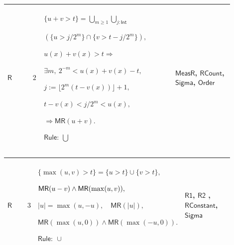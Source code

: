 \documentclass[12pt,reqno]{amsart}
\theoremstyle{blueplain}
\numberwithin{equation}{section}
\begin{document}
{\scriptsize \setlength{\parskip}{0pt}\nointerlineskip
\noindent 
\begin{tabular}{|@{}>{\centering\arraybackslash}m{0.10658\linewidth}|>{\centering\arraybackslash}m{0.03553\linewidth}|>{\centering\arraybackslash}m{0.52105\linewidth}|>{\centering\arraybackslash}m{0.23684\linewidth}|}
\hline
\hypertarget{dct:R2}{$\displaystyle \mathsf{R}$} & $\displaystyle 2$ & $%
\displaystyle \{u+v>t\}=\bigcup_{m\ge1}\bigcup_{j:\mathsf{Int}}$\par$%
\displaystyle (\{u>j/2^m\}\cap\{v>t-j/2^m\}),$\par$\displaystyle %
u(x)+v(x)>t\Rightarrow$\par$\displaystyle \exists m,\ 2^{-m}<u(x)+v(x)-t,$%
\par$\displaystyle j:=\lfloor2^m(t-v(x))\rfloor+1,$\par$\displaystyle %
t-v(x)<j/2^m<u(x),$\par$\displaystyle \Rightarrow\mathsf{MR}(u+v).$\par$%
\displaystyle \mathsf{Rule}:\ \bigcup$ & \hyperlink{dctdef:MeasR}{$%
\displaystyle \mathsf{MeasR}$}, \hyperlink{dct:RCount}{$\displaystyle 
\mathsf{RCount}$}, \hyperlink{ax:Sigma}{$\displaystyle \mathsf{Sigma}$}, 
\hyperlink{ax:Order}{$\displaystyle \mathsf{Order}$} \\ \hline
\end{tabular}%
}

{\scriptsize \setlength{\parskip}{0pt}\nointerlineskip
\noindent 
\begin{tabular}{|@{}>{\centering\arraybackslash}m{0.10658\linewidth}|>{\centering\arraybackslash}m{0.03553\linewidth}|>{\centering\arraybackslash}m{0.52105\linewidth}|>{\centering\arraybackslash}m{0.23684\linewidth}|}
\hline
\hypertarget{dct:R3}{$\displaystyle \mathsf{R}$} & $\displaystyle 3$ & $%
\displaystyle \{\max(u,v)>t\}=\{u>t\}\cup\{v>t\},$\par$\displaystyle \mathsf{%
MR}(u-v)\land\mathsf{MR}(\max(u,v)),$\par$\displaystyle |u|=\max(u,-u),\quad%
\mathsf{MR}(|u|),$\par$\displaystyle \mathsf{MR}(\max(u,0))\land\mathsf{MR}%
(\max(-u,0)).$\par$\displaystyle \mathsf{Rule}:\ \cup$ & \hyperlink{dct:R1}{$%
\displaystyle \mathsf{R1}$}, \hyperlink{dct:R2}{$\displaystyle \mathsf{R2}$}%
, \hyperlink{dct:RConstant}{$\displaystyle \mathsf{RConstant}$}, \hyperlink{ax:Sigma}%
{$\displaystyle \mathsf{Sigma}$} \\ \hline
\end{tabular}%
}
\end{document}
